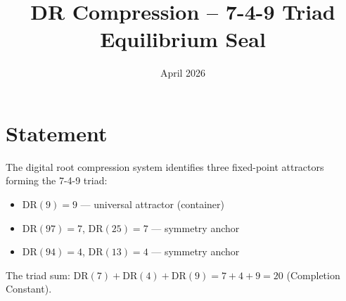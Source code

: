 \documentclass{article}
\title{DR Compression -- 7-4-9 Triad Equilibrium Seal}
\date{April 2026}
\begin{document}
\maketitle

\section{Statement}

The digital root compression system identifies three fixed-point attractors forming the 7-4-9 triad:

\begin{itemize}
\item $\mathrm{DR}(9) = 9$ — universal attractor (container)
\item $\mathrm{DR}(97) = 7$, $\mathrm{DR}(25) = 7$ — symmetry anchor
\item $\mathrm{DR}(94) = 4$, $\mathrm{DR}(13) = 4$ — symmetry anchor
\end{itemize}

The triad sum: $\mathrm{DR}(7) + \mathrm{DR}(4) + \mathrm{DR}(9) = 7 + 4 + 9 = 20$ (Completion Constant).
\end{document}
